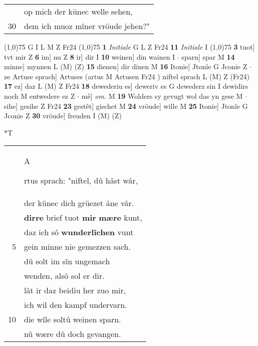 \documentclass[8pt,a4paper,notitlepage]{article}
\begin{document}
\begin{table}[ht]
\begin{minipage}[t]{0.5\linewidth}
\begin{tabular}{rl}
 & op mich der künec welle sehen,\\ 
30 & dem ich muoz mîner vröude jehen?"\\ 
\end{tabular}
\scriptsize
\line(1,0){75} \newline
G I L M Z Fr24 \newline
\line(1,0){75} \newline
\textbf{1} \textit{Initiale} G L Z Fr24  \textbf{11} \textit{Initiale} I  \newline
\line(1,0){75} \newline
\textbf{3} tuot] tvt mir Z \textbf{6} im] nu Z \textbf{8} ir] dir I \textbf{10} weinen] din wainen I  $\cdot$ sparn] spar M \textbf{14} minne] mynnen L (M) (Z) \textbf{15} dienen] dir dinen M \textbf{16} Itonie] Jtonîe G Jconie Z  $\cdot$ ze Artuse sprach] Artuses (artus M Artusen Fr24 ) niftel sprach L (M) Z (Fr24) \textbf{17} ez] daz L (M) Z Fr24 \textbf{18} dewederiu es] deweriv es G dewederz sin I dewidirs noch M entwedere ez Z  $\cdot$ mê] \textit{om.} M \textbf{19} Wolders sy gevugt wol das yn gese M  $\cdot$ sihe] gesihe Z Fr24 \textbf{23} gestêt] gischet M \textbf{24} vröude] wille M \textbf{25} Itonie] Jtonîe G Jconie Z \textbf{30} vröude] freuden I (M) (Z) \newline
\end{minipage}
\hspace{0.5cm}
\begin{minipage}[t]{0.5\linewidth}
\small
\begin{center}*T
\end{center}
\begin{tabular}{rl}
 & \begin{large}A\end{large}rtus sprach: "niftel, dû hâst wâr,\\ 
 & der künec dich grüezet âne vâr.\\ 
 & \textbf{dirre} brief tuot \textbf{mir} \textbf{mære} kunt,\\ 
 & daz ich sô \textbf{wunderlîchen} vunt\\ 
5 & gein minne nie gemezzen sach.\\ 
 & dû solt im sîn ungemach\\ 
 & wenden, alsô sol er dir.\\ 
 & lât ir daz beidiu her zuo mir,\\ 
 & ich wil den kampf undervarn.\\ 
10 & die wîle soltû weinen sparn.\\ 
 & nû wære dû doch gevangen.\\ 

\end{tabular}
\end{minipage}
\end{table}
\end{document}
